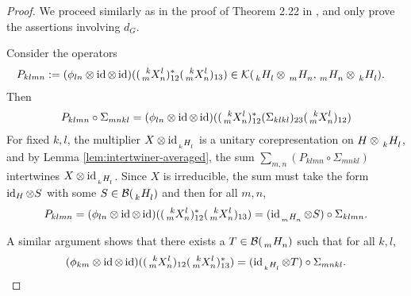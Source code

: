 \begin{proof}
  We proceed similarly as in the proof of  Theorem 2.22 in \cite{}, and only prove the assertions
  involving $d_{G}$.

  Consider the operators
  \begin{align*}
    P_{klmn} &:= (\phi_{ln} \otimes \id \otimes
    \id)((\Gr{X}{k}{l}{m}{n})^{*}_{12}(\Gr{X}{k}{l}{m}{n})_{13})  \in
    \mathcal{K}(\Grd{H}{k}{l} \otimes \Grd{H}{m}{n}, \Grd{H}{m}{n}\otimes \Grd{H}{k}{l}).
  \end{align*}
  Then
  \begin{align*}
    P_{klmn} \circ \Sigma_{mnkl} = (\phi_{ln} \otimes \id \otimes \id)((\Gr{X}{k}{l}{m}{n})^{*}_{12}(\Sigma_{klkl})_{23}(\Gr{X}{k}{l}{m}{n})_{12})
  \end{align*}
  For fixed $k,l$, the multiplier $X \otimes \id_{\Grd{H}{k}{l}}$ is a unitary corepresentation on
  $H \otimes \Grd{H}{k}{l}$, and by Lemma \ref{lem:intertwiner-averaged}, the sum $\sum_{m,n}
  (P_{klmn}\circ \Sigma_{mnkl})$ intertwines $X \otimes \id_{\Grd{H}{k}{l}}$. Since $X$ is
  irreducible, the sum must take the form $\operatorname{id}_{H} \otimes S$ with some $S\in
  \mathcal{B}(\Grd{H}{k}{l})$ and then for all $m,n$,
  \begin{align} \label{eq:schur-aux-1}
    P_{klmn} = (\phi_{ln} \otimes \id \otimes
    \id)((\Gr{X}{k}{l}{m}{n})^{*}_{12}(\Gr{X}{k}{l}{m}{n})_{13})= (\id_{\Grd{H}{m}{n}} \otimes
    S) \circ \Sigma_{klmn}.
  \end{align}

  A similar argument shows that there exists a $T\in \mathcal{B}(\Grd{H}{m}{n})$ such that for all
  $k,l$,
\begin{align} \label{eq:schur-aux-2} 
  (\phi_{km} \otimes \id \otimes
  \id)((\Gr{X}{k}{l}{m}{n})_{12}(\Gr{X}{k}{l}{m}{n})^{*}_{13})= (\id_{\Grd{H}{k}{l}} \otimes T) \circ
  \Sigma_{mnkl}.
  \end{align}


\end{proof}
